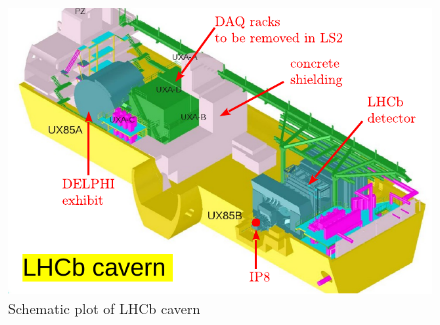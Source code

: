 \begin{figure}[h]
\centering
    \includegraphics[width=12cm]{figs/INT/lhcb_cavern.pdf}
    \vspace{0.15cm}
\caption{ 
   Schematic plot of LHCb cavern 
}
\end{figure}
